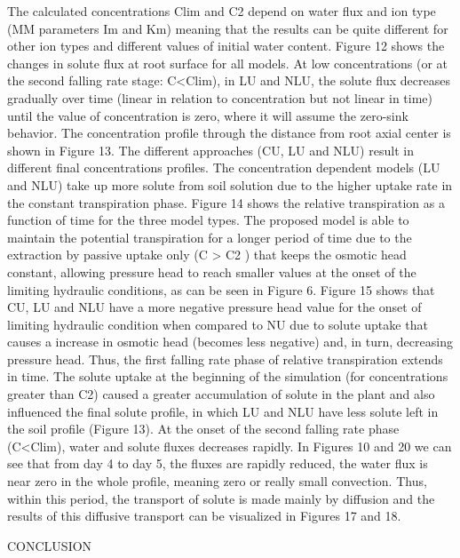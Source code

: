 The calculated concentrations Clim and C2 depend on water flux and ion type (MM parameters Im and Km) meaning that the results can be quite different for other ion types and different values of initial water content.
Figure 12 shows the changes in solute flux at root surface for all models. At low concentrations (or at the second falling rate stage: C<Clim), in LU and NLU, the solute flux decreases gradually over time (linear in relation to concentration but not linear in time) until the value of concentration is zero, where it will assume the zero-sink behavior.
The concentration profile through the distance from root axial center is shown in Figure 13. The different approaches (CU, LU and NLU) result in different final concentrations profiles. The concentration dependent models (LU and NLU) take up more solute from soil solution due to the higher uptake rate in the constant transpiration phase.
Figure 14 shows the relative transpiration as a function of time for the three model types. The proposed model is able to maintain the potential transpiration for a longer period of time due to the extraction by passive uptake only (C > C2 ) that keeps the osmotic head constant, allowing pressure head to reach smaller values at the onset of the limiting hydraulic conditions, as can be seen in Figure 6.
Figure 15 shows that CU, LU and NLU have a more negative pressure head value for the onset of limiting hydraulic condition when compared to NU due to solute uptake that causes a increase in osmotic head (becomes less negative) and, in turn, decreasing pressure head. Thus, the first falling rate phase of relative transpiration extends in time. The solute uptake at the beginning of the simulation (for concentrations greater than C2) caused a greater accumulation of solute in the plant and also influenced the final solute profile, in which LU and NLU have less solute left in the soil profile (Figure 13).
At the onset of the second falling rate phase (C<Clim), water and solute fluxes decreases rapidly. In Figures 10 and 20 we can see that from day 4 to day 5, the fluxes are rapidly reduced, the water flux is near zero in the whole profile, meaning zero or really small convection. Thus, within this period, the transport of solute is made mainly by diffusion and the results of this diffusive transport can be visualized in Figures 17 and 18.



\cleardoublepage
\chap CONCLUSION

